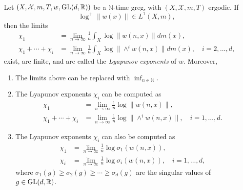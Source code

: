 \documentclass{report}
\begin{document}
\begin{definition}
    \ \\
    Let $(X, \mathcal X, m, T, w, \operatorname{{\mathrm{GL}}}(d,\mathbb R))$ be a $\mathbb N$-time greg, with $(X, \mathcal X, m, T)$ ergodic.
    If 
    \[
    \log^+ \|w(x)\| \in L^1(X, m),
    \]
    then the limits
    \begin{align*}
        \chi_1 &= \lim_{n \to \infty} \frac{1}{n} \int_X \log \|w(n,x)\| dm(x),\\
        \chi_1 + \cdots + \chi_i &= \lim_{n \to \infty} \frac{1}{n} \int_X \log \|\wedge^i w(n,x)\| dm(x), \quad i = 2, \ldots, d,
    \end{align*}
    exist, are finite, and are called the \emph{Lyapunov exponents} of $w$.
    Moreover,
    \begin{enumerate}[label=(\roman*)]
        \item The limits above can be replaced with $\inf_{n \in \mathbb N}$.
        \item The Lyapunov exponents $\chi_i$ can be computed as
        \begin{align*}
            \chi_1 &= \lim_{n \to \infty} \frac{1}{n} \log \|w(n,x)\|,\\
            \chi_1 + \cdots + \chi_i &= \lim_{n \to \infty} \frac{1}{n} \log \|\wedge^i w(n,x)\|, \quad i = 1, \ldots, d.
        \end{align*}
        \item The Lyapunov exponents $\chi_i$ can also be computed as
        \begin{align*}
            \chi_1 &= \lim_{n \to \infty} \frac{1}{n} \log \sigma_1(w(n,x)),\\
            \chi_i &= \lim_{n \to \infty} \frac{1}{n} \log \sigma_i(w(n,x)), \quad i = 1, \ldots, d,
        \end{align*}
        where $\sigma_1(g) \geq \sigma_2(g) \geq \cdots \geq \sigma_d(g)$ are the singular values of $g \in \operatorname{{\mathrm{GL}}}(d,\mathbb R)$.
    \end{enumerate}
\end{definition}
\end{document}

